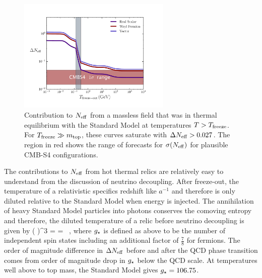 \begin{figure}[t!]
\begin{center}
\includegraphics[width=0.65\textwidth]{Neutrinos/Neff.pdf}
\caption{Contribution to $N_{\rm eff}$ from a massless field that was in thermal equilibrium with the Standard Model at temperatures $T> T_{\rm freeze}$.  For $T_{\rm freeze} \gg m_{\rm top}$, these curves saturate with $\Delta N_{\rm eff} > 0.027$.   The region in red shows the range of forecasts for $\sigma(N_{\rm eff})$ for plausible CMB-S4 configurations. }
\label{fig:Neff_thermal}
\end{center}
\end{figure} 

The contributions to $N_{\rm eff}$ from hot thermal relics are relatively easy to understand from the discussion of neutrino decoupling.  After freeze-out, the temperature of a relativistic specifics redshift like $a^{-1}$ and therefore is only diluted relative to the Standard Model when energy is injected.  The annihilation of heavy Standard Model particles into photons conserves the comoving entropy and therefore, the diluted temperature of a relic before neutrino decoupling is given by
\beq
\left(  \right)^3 = =  \, ,
\eeq
where $g_{\star}$ is defined as above to be the number of independent spin states including an additional factor of $\frac{7}{8}$ for fermions.  The order of magnitude difference in $\Delta N_{\rm eff}$ before and after the QCD phase transition comes from order of magnitude drop in $g_{\star}$ below the QCD scale.  At temperatures well above to top mass, the Standard Model gives $g_{\star} = 106.75$.  

